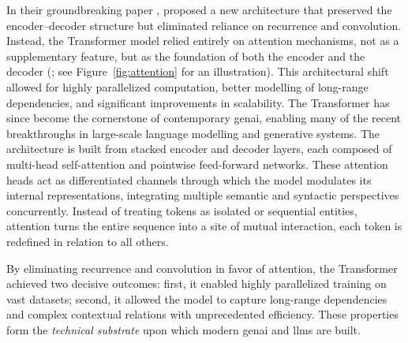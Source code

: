 In their groundbreaking paper , \textcite{vaswani2017a} proposed a new architecture that preserved the encoder–decoder structure but eliminated reliance on recurrence and convolution. Instead, the Transformer model relied entirely on attention mechanisms, not as a supplementary feature, but as the foundation of both the encoder and the decoder (\cite[1–2]{vaswani2017a}; see Figure~\ref{fig:attention} for an illustration). This architectural shift allowed for highly parallelized computation, better modelling of long-range dependencies, and significant improvements in scalability. The Transformer has since become the cornerstone of contemporary \gls{genai}, enabling many of the recent breakthroughs in large-scale language modelling and generative systems. The architecture is built from stacked encoder and decoder layers, each composed of multi-head self-attention and pointwise feed-forward networks. These attention heads act as differentiated channels through which the model modulates its internal representations, integrating multiple semantic and syntactic perspectives concurrently. Instead of treating \glspl{token} as isolated or sequential entities, attention turns the entire sequence into a site of mutual interaction, each token is redefined in relation to all others.

By eliminating recurrence and convolution in favor of attention, the Transformer
achieved two decisive outcomes: first, it enabled highly parallelized training
on vast datasets; second, it allowed the model to capture long-range
dependencies and complex contextual relations with unprecedented efficiency.
These properties form the \emph{technical substrate} upon which modern
\gls{genai} and \glspl{llm} are built.


